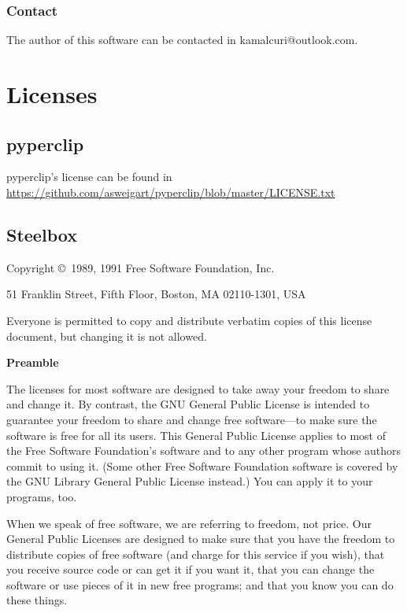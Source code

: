 \documentclass{article}
\begin{document}
  \subsubsection{Contact}
  The author of this software can be contacted in kamalcuri@outlook.com.

  \section{Licenses}
    \subsection{pyperclip}
    pyperclip's license can be found in \url{https://github.com/asweigart/pyperclip/blob/master/LICENSE.txt}
    \subsection{Steelbox}
    \begin{center}
      {\parindent 0in
      
      Copyright \copyright\ 1989, 1991 Free Software Foundation, Inc.
      
      \bigskip
      
      51 Franklin Street, Fifth Floor, Boston, MA  02110-1301, USA
      
      \bigskip
      
      Everyone is permitted to copy and distribute verbatim copies
      of this license document, but changing it is not allowed.
      }
      \end{center}
      
      \begin{center}
      {\bf\large Preamble}
      \end{center}
      
      
      The licenses for most software are designed to take away your freedom to
      share and change it.  By contrast, the GNU General Public License is
      intended to guarantee your freedom to share and change free software---to
      make sure the software is free for all its users.  This General Public
      License applies to most of the Free Software Foundation's software and to
      any other program whose authors commit to using it.  (Some other Free
      Software Foundation software is covered by the GNU Library General Public
      License instead.)  You can apply it to your programs, too.
      
      When we speak of free software, we are referring to freedom, not price.
      Our General Public Licenses are designed to make sure that you have the
      freedom to distribute copies of free software (and charge for this service
      if you wish), that you receive source code or can get it if you want it,
      that you can change the software or use pieces of it in new free programs;
      and that you know you can do these things.
      
\end{document}
